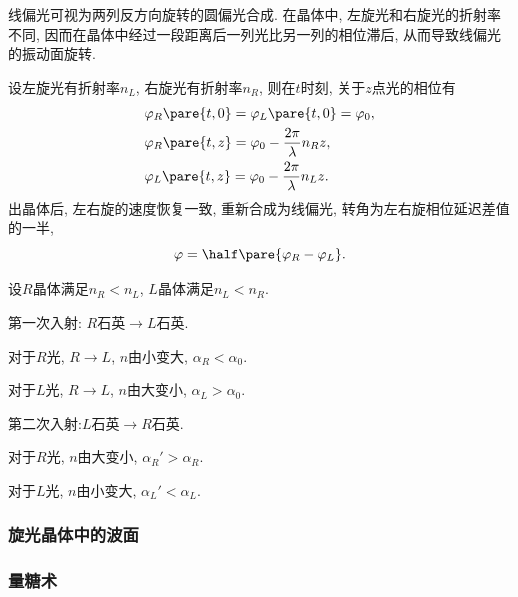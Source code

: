 \documentclass{ctexart}
\begin{document}
线偏光可视为两列反方向旋转的圆偏光合成. 在晶体中, 左旋光和右旋光的折射率不同, 因而在晶体中经过一段距离后一列光比另一列的相位滞后, 从而导致线偏光的振动面旋转.
\par
设左旋光有折射率$n_L$, 右旋光有折射率$n_R$, 则在$t$时刻, 关于$z$点光的相位有
\begin{align*}
    & \varphi_R\pare{t,0} = \varphi_L\pare{t,0} = \varphi_0, \\
    & \varphi_R\pare{t,z} = \varphi_0 - \frac{2\pi}{\lambda}n_R z, \\
    & \varphi_L\pare{t,z} = \varphi_0 - \frac{2\pi}{\lambda}n_L z.
\end{align*}
出晶体后, 左右旋的速度恢复一致, 重新合成为线偏光, 转角为左右旋相位延迟差值的一半,
\[ \varphi = \half\pare{\varphi_R - \varphi_L}. \]
\par
{}
设$R$晶体满足$n_R<n_L$, $L$晶体满足$n_L < n_R$.
\begin{cenum}
    \item 第一次入射: $R$石英$\rightarrow L$石英.
    \begin{cenum}
        \item 对于$R$光, $R\rightarrow L$, $n$由小变大, $\alpha_R < \alpha_0$.
        \item 对于$L$光, $R\rightarrow L$, $n$由大变小, $\alpha_L > \alpha_0$.
    \end{cenum}
    \item 第二次入射:$L$石英$\rightarrow R$石英.
    \begin{cenum}
        \item 对于$R$光, $n$由大变小, $\alpha_{R}' > \alpha_R$.
        \item 对于$L$光, $n$由小变大, $\alpha_{L}' < \alpha_L$.
    \end{cenum}
\end{cenum}


\subsubsection{旋光晶体中的波面} %
\label{ssub:旋光晶体中的波面}



\subsubsection{量糖术} %
\label{ssub:量糖术}
\end{document}
